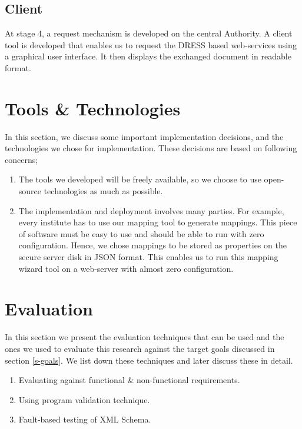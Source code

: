 \documentclass[12pt,a4paper,oneside]{book}
\begin{document}
\subsection{Client}
At stage 4, a request mechanism is developed on the central Authority. A client tool is developed that enables us to request the DRESS based web-services using a graphical user interface. It then displays the exchanged document in readable format.

\section{Tools \& Technologies}
In this section, we discuss some important implementation decisions, and the technologies we chose for implementation. These decisions are based on following concerns;

\begin{enumerate}

\item The tools we developed will be freely available, so we choose to use open-source technologies as much as possible.

\item The implementation and deployment involves many parties. For example, every institute has to use our mapping tool to generate mappings. This piece of software must be easy to use and should be able to run with zero configuration. Hence, we chose mappings to be stored as properties on the secure server disk in JSON format. This enables us to run this mapping wizard tool on a web-server with almost zero configuration.	

\end{enumerate}

\section{Evaluation}
In this section we present the evaluation techniques that can be used and the ones we used to evaluate this research against the target goals discussed in section \ref{s-goals}. We list down these techniques and later discuss these in detail.

	\begin{enumerate}

	\item Evaluating against functional \& non-functional requirements.

	\item Using program validation technique. \cite{Sieve}
	
	\item Fault-based testing of XML Schema.
	
	

	\end{enumerate}
	
\end{document}
